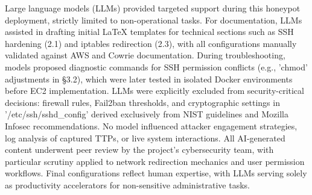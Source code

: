 Large language models (LLMs) provided targeted support during this honeypot deployment, strictly limited to non-operational tasks. For documentation, LLMs assisted in drafting initial LaTeX templates for technical sections such as SSH hardening (2.1) and iptables redirection (2.3), with all configurations manually validated against AWS and Cowrie documentation. During troubleshooting, models proposed diagnostic commands for SSH permission conflicts (e.g., 'chmod' adjustments in §3.2), which were later tested in isolated Docker environments before EC2 implementation. LLMs were explicitly excluded from security-critical decisions: firewall rules, Fail2ban thresholds, and cryptographic settings in '/etc/ssh/sshd\_config' derived exclusively from NIST guidelines and Mozilla Infosec recommendations. No model influenced attacker engagement strategies, log analysis of captured TTPs, or live system interactions. 
All AI-generated content underwent peer review by the project’s cybersecurity team, with particular scrutiny applied to network redirection mechanics and user permission workflows. Final configurations reflect human expertise, with LLMs serving solely as productivity accelerators for non-sensitive administrative tasks.    


